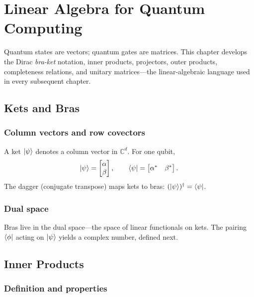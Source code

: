 \chapter{Linear Algebra for Quantum Computing}
\label{ch:linear-algebra}

Quantum states are vectors; quantum gates are matrices. This chapter develops the Dirac \emph{bra-ket} notation, inner products, projectors, outer products, completeness relations, and unitary matrices---the linear-algebraic language used in every subsequent chapter.

\section{Kets and Bras}
\label{sec:kets-bras}

\subsection{Column vectors and row covectors}

A ket $\ket{\psi}$ denotes a column vector in $\mathbb{C}^d$. For one qubit,
\begin{equation}
\ket{\psi}=\begin{bmatrix}\alpha\\\beta\end{bmatrix},\qquad
\bra{\psi}=\begin{bmatrix}\alpha^*&\beta^*\end{bmatrix}.
\label{eq:ket-bra}
\end{equation}
The dagger (conjugate transpose) maps kets to bras: $(\ket{\psi})^\dagger=\bra{\psi}$.

\subsection{Dual space}

Bras live in the dual space---the space of linear functionals on kets. The pairing $\bra{\phi}$ acting on $\ket{\psi}$ yields a complex number, defined next.

\section{Inner Products}
\label{sec:inner-products}

\subsection{Definition and properties}

